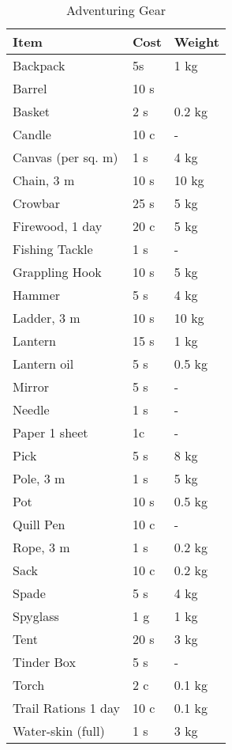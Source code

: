 \documentclass[a4paper,11pt,oneside]{book}
\begin{document}
\begin{table}[ht]
	\centering
	\caption{Adventuring Gear}
	\begin{tabular}{|l|l|l|}
		\hline
		Item & Cost & Weight\\ [0.5ex]
		\hline
		Backpack & 5s & 1 kg\\
		Barrel & 10 s & \\
		Basket & 2 s & 0.2 kg\\
		Candle & 10 c & -\\
		Canvas (per sq. m) & 1 s & 4 kg\\
		Chain, 3 m & 10 s & 10 kg\\
		Crowbar & 25 s & 5 kg\\
		Firewood, 1 day & 20 c & 5 kg\\
		Fishing Tackle & 1 s & -\\
		Grappling Hook & 10 s & 5 kg\\
		Hammer & 5 s & 4 kg\\
		Ladder, 3 m & 10 s & 10 kg\\
		Lantern & 15 s & 1 kg\\
		Lantern oil & 5 s & 0.5 kg \\
		Mirror & 5 s & -\\
		Needle & 1 s & -\\
		Paper 1 sheet & 1c & -\\
		Pick & 5 s & 8 kg\\
		Pole, 3 m & 1 s & 5 kg\\
		Pot & 10 s & 0.5 kg\\
		Quill Pen & 10 c & -\\
		Rope, 3 m & 1 s & 0.2 kg\\
		Sack & 10 c & 0.2 kg\\
		Spade & 5 s & 4 kg\\
		Spyglass & 1 g & 1 kg\\
		Tent & 20 s & 3 kg\\
		Tinder Box & 5 s & -\\
		Torch & 2 c & 0.1 kg\\
		Trail Rations 1 day & 10 c & 0.1 kg\\
		Water-skin (full) & 1 s & 3 kg\\		
		\hline
	\end{tabular}
\end{table}
\end{document}
